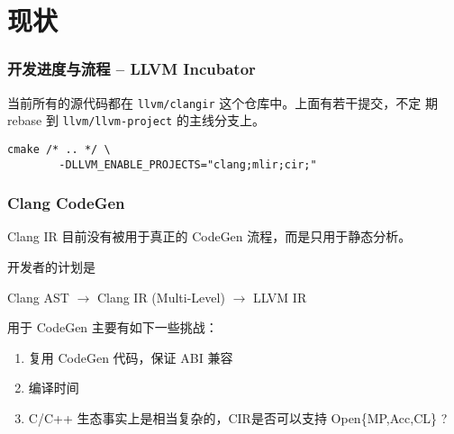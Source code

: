 \section{现状}

\begin{frame}[fragile]
    \frametitle{开发进度与流程 -- LLVM Incubator}

    当前所有的源代码都在 \texttt{llvm/clangir} 这个仓库中。上面有若干提交，不定
    期 rebase 到 \texttt{llvm/llvm-project} 的主线分支上。

    \vspace{2em}
    \begin{lstlisting}[caption=启用ClangIR目前需要的编译指令]
        cmake /* .. */ \
        -DLLVM_ENABLE_PROJECTS="clang;mlir;cir;"
    \end{lstlisting}


\end{frame}

\begin{frame}
    \frametitle{Clang CodeGen}

    Clang IR 目前没有被用于真正的 CodeGen 流程，而是只用于静态分析。

    开发者的计划是
    \begin{center}
        Clang AST $\rightarrow$ Clang IR (Multi-Level) $\rightarrow$ LLVM IR
    \end{center}

    用于 CodeGen 主要有如下一些挑战：

    \begin{enumerate}
        \item 复用 CodeGen 代码，保证 ABI 兼容
        \item 编译时间
        \item C/C++ 生态事实上是相当复杂的，CIR是否可以支持 Open\{MP,Acc,CL\} ?
    \end{enumerate}
\end{frame}
